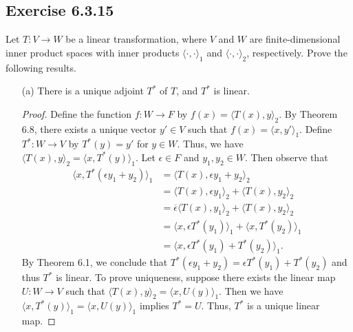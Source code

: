\subsection*{Exercise 6.3.15} Let \( T: V \to W  \) be a linear transformation, where \( V  \) and \( W  \) are finite-dimensional inner product spaces with inner products \( \langle \cdot , \cdot \rangle_1  \) and \( \langle \cdot , \cdot \rangle_{2} \), respectively. Prove the following results.

\begin{enumerate}
    \item[(a)] There is a unique adjoint \( T^{*} \) of \( T  \), and \( T^{*}  \) is linear.
        \begin{proof}
            Define the function \( f: W \to F  \) by \( f(x) = \langle T(x) , y \rangle_{2} \). By Theorem 6.8, there exists a unique vector \( y' \in V  \) such that \( f(x) = \langle x  , y' \rangle_{1} \). Define \( T^{*}: W \to V  \) by \( T^{*}(y) = y' \) for \( y \in W  \). Thus, we have \( \langle T(x)  , y \rangle_{2} = \langle x , T^{*}(y) \rangle_{1} \). Let \( \epsilon \in F  \) and \( {y}_{1}, {y}_{2} \in W  \). Then observe that
            \begin{align*}
                \langle x , T^{*}(\epsilon {y}_{1} + {y}_{2}) \rangle_1 &= \langle T(x) , \epsilon {y}_{1} + {y}_{2} \rangle_2 \\
                                                                        &= \langle T(x)  , \epsilon {y}_{1} \rangle_2 +  \langle T(x) , {y}_{2} \rangle_2 \\
                                                                        &= \overline{\epsilon} \langle T(x) , {y}_{1} \rangle_2 + \langle T(x)  , {y}_{2} \rangle_2 \\
                                                                        &=\langle x  , \epsilon T^{*}({y}_{1}) \rangle_1 + \langle x  , T^{*}({y}_{2}) \rangle_1 \\
                                                                        &=  \langle x  , \epsilon T^{*}({y}_{1}) + T^{*}({y}_{2}) \rangle_1.
            \end{align*} 
            By Theorem 6.1, we conclude that \( T^{*}(\epsilon {y}_{1} + {y}_{2}) = \epsilon T^{*}({y}_{1}) + T^{*}({y}_{2}) \) and thus \( T^{*}  \) is linear. To prove uniqueness, suppose there exists the linear map \( U: W \to V  \) such that \( \langle T(x) , y \rangle_2 = \langle x  , U(y) \rangle_1 \). Then we have \( \langle x , T^{*}(y) \rangle_1 = \langle x  ,  U(y) \rangle_1  \) implies \( T^{*} = U  \). Thus, \( T^{*} \) is a unique linear map.

\end{proof}
\end{enumerate}
